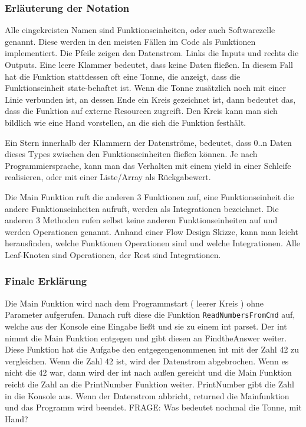 \documentclass[11pt]{article}
\begin{document}
\subsubsection{Erläuterung der Notation}
\label{sec:orgheadline51}
Alle eingekreisten Namen sind Funktionseinheiten, oder auch Softwarezelle genannt.
Diese werden in den meisten Fällen im Code als Funktionen implementiert.
Die Pfeile zeigen den Datenstrom. Links die Inputs und rechts die Outputs.
Eine leere Klammer bedeutet, dass keine Daten fließen.
In diesem Fall hat die Funktion stattdessen oft eine Tonne, die anzeigt, dass die Funktionseinheit state-behaftet ist.
Wenn die Tonne zusätzlich noch mit einer Linie verbunden ist, an dessen Ende ein Kreis gezeichnet ist,
dann bedeutet das, dass die Funktion auf externe Resourcen zugreift.
Den Kreis kann man sich bildlich wie eine Hand vorstellen, an die sich die Funktion festhält.

Ein Stern innerhalb der Klammern der Datenströme, bedeutet, dass 0..n Daten dieses Types zwischen
den Funktionseinheiten fließen können.
Je nach Programmiersprache, kann man das Verhalten mit einem yield in einer Schleife realisieren,
oder mit einer Liste/Array als Rückgabewert.

Die Main Funktion ruft die anderen 3 Funktionen auf, eine Funktionseinheit die andere Funktionseinheiten aufruft,
werden als Integrationen bezeichnet. Die anderen 3 Methoden rufen selbst keine anderen Funktionseinheiten auf und werden
Operationen genannt. Anhand einer Flow Design Skizze, kann man leicht herausfinden, welche Funktionen Operationen sind und welche
Integrationen.
Alle Leaf-Knoten sind Operationen, der Rest sind Integrationen.
\subsubsection{Finale Erklärung}
\label{sec:orgheadline52}
Die Main Funktion wird nach dem Programmstart ( leerer Kreis ) ohne Parameter aufgerufen.
Danach ruft diese die Funktion \texttt{ReadNumbersFromCmd} auf, welche aus der Konsole eine Eingabe ließt und sie
zu einem int parset. Der int nimmt die Main Funktion entgegen und gibt diesen an FindtheAnswer weiter.
Diese Funktion hat die Aufgabe den entgegengenommenen int mit der Zahl 42 zu vergleichen. Wenn die Zahl 42 ist, wird der Datenstrom
abgebrochen. Wenn es nicht die 42 war, dann wird der int nach außen gereicht und die Main Funktion reicht die Zahl an die
PrintNumber Funktion weiter. PrintNumber gibt die Zahl in die Konsole aus.
Wenn der Datenstrom abbricht, returned die Mainfunktion und das Programm wird beendet.
FRAGE: Was bedeutet nochmal die Tonne, mit Hand?
\end{document}
